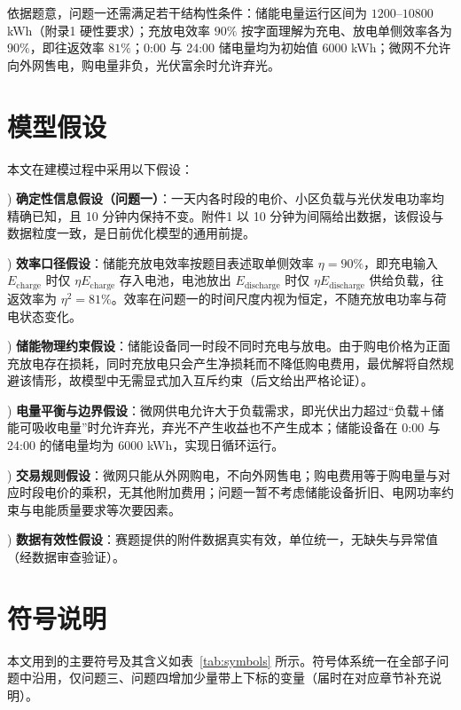 \documentclass[zihao=-4,a4paper,UTF8,fontset=none]{ctexart}
\begin{document}
依据题意，问题一还需满足若干结构性条件：储能电量运行区间为 $1200$--$10800$ kWh（附录1 硬性要求）；充放电效率 $90\%$ 按字面理解为充电、放电单侧效率各为 $90\%$，即往返效率 $81\%$；0:00 与 24:00 储电量均为初始值 $6000$ kWh；微网不允许向外网售电，购电量非负，光伏富余时允许弃光。

\section{模型假设}

本文在建模过程中采用以下假设：

) \textbf{确定性信息假设（问题一）}：一天内各时段的电价、小区负载与光伏发电功率均精确已知，且 10 分钟内保持不变。附件1 以 10 分钟为间隔给出数据，该假设与数据粒度一致，是日前优化模型的通用前提。

) \textbf{效率口径假设}：储能充放电效率按题目表述取单侧效率 $\eta = 90\%$，即充电输入 $E_{\mathrm{charge}}$ 时仅 $\eta E_{\mathrm{charge}}$ 存入电池，电池放出 $E_{\mathrm{discharge}}$ 时仅 $\eta E_{\mathrm{discharge}}$ 供给负载，往返效率为 $\eta^2 = 81\%$。效率在问题一的时间尺度内视为恒定，不随充放电功率与荷电状态变化。

) \textbf{储能物理约束假设}：储能设备同一时段不同时充电与放电。由于购电价格为正面充放电存在损耗，同时充放电只会产生净损耗而不降低购电费用，最优解将自然规避该情形，故模型中无需显式加入互斥约束（后文给出严格论证）。

) \textbf{电量平衡与边界假设}：微网供电允许大于负载需求，即光伏出力超过“负载＋储能可吸收电量”时允许弃光，弃光不产生收益也不产生成本；储能设备在 0:00 与 24:00 的储电量均为 $6000$ kWh，实现日循环运行。

) \textbf{交易规则假设}：微网只能从外网购电，不向外网售电；购电费用等于购电量与对应时段电价的乘积，无其他附加费用；问题一暂不考虑储能设备折旧、电网功率约束与电能质量要求等次要因素。

) \textbf{数据有效性假设}：赛题提供的附件数据真实有效，单位统一，无缺失与异常值（经数据审查验证）。

\section{符号说明}

本文用到的主要符号及其含义如表~\ref{tab:symbols} 所示。符号体系统一在全部子问题中沿用，仅问题三、问题四增加少量带上下标的变量（届时在对应章节补充说明）。
\end{document}
